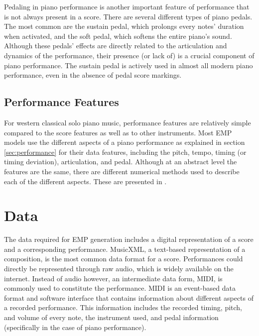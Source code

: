 Pedaling in piano performance is another important feature of performance that is not always present in a score. There are several different types of piano pedals. The most common are the sustain pedal, which prolongs every notes' duration when activated, and the soft pedal, which softens the entire piano's sound. Although these pedals' effects are directly related to the articulation and dynamics of the performance, their presence (or lack of) is a crucial component of piano performance. The sustain pedal is actively used in almost all modern piano performance, even in the absence of pedal score markings. 

\subsection{Performance Features}
For western classical solo piano music, performance features are relatively simple compared to the score features as well as to other instruments. Most EMP models use the different aspects of a piano performance as explained in section \ref{sec:performance} for their data features, including the pitch, tempo, timing (or timing deviation), articulation, and pedal. Although at an abstract level the features are the same, there are different numerical methods used to describe each of the different aspects. These are presented in . 

\section{Data}
The data required for EMP generation includes a digital representation of a score and a corresponding performance. MusicXML, a text-based representation of a composition, is the most common data format for a score. Performances could directly be represented through raw audio, which is widely available on the internet. Instead of audio however, an intermediate data form, MIDI, is commonly used to constitute the performance. MIDI is an event-based data format and software interface that contains information about different aspects of a recorded performance. This information includes the recorded timing, pitch, and volume of every note, the instrument used, and pedal information (specifically in the case of piano performance). 


